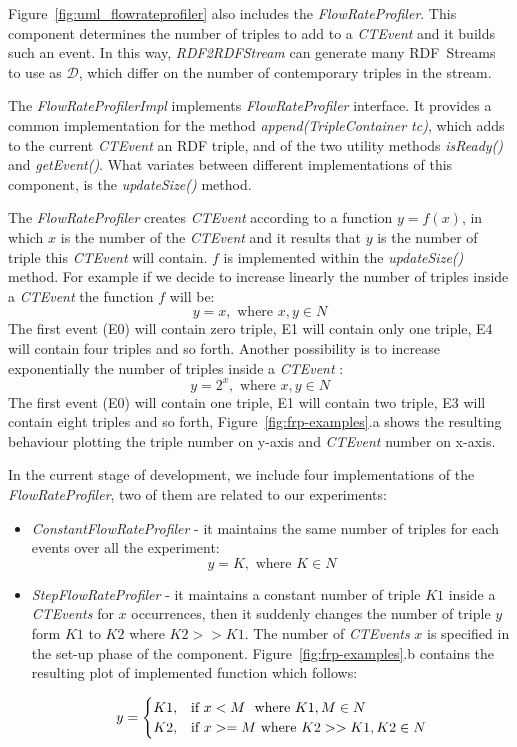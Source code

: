 Figure~\ref{fig:uml_flowrateprofiler} also includes the \textit{FlowRateProfiler}. This component determines the number of triples to add to a \textit{CTEvent} and it builds such an event. In this way, \textit{RDF2RDFStream} can generate many RDF~Streams to use as $\mathcal{D}$, which differ on the number of contemporary triples in the stream. 



The \textit{FlowRateProfilerImpl} implements \textit{FlowRateProfiler} interface. It provides a common implementation for the method \textit{append(TripleContainer tc)}, which adds to the current \textit{CTEvent} an RDF triple,  and of the two utility methods \textit{isReady()} and \textit{getEvent()}. What variates between different implementations of this component, is the \textit{updateSize()} method. 

The \textit{FlowRateProfiler} creates \textit{CTEvent} according to a function $y=f(x)$, in which $x$ is the number of the \textit{CTEvent} and it results that $y$ is the number of triple this \textit{CTEvent} will contain.  $f$ is implemented within the \textit{updateSize()} method. For example if we decide to increase linearly the number of triples inside a \textit{CTEvent} the function $f$ will be: \[y=x, \text{ where } x,y \in N\]
The first event (E0) will contain zero triple, E1 will contain only one triple, E4 will contain four triples and so forth. Another possibility is to increase exponentially the number of triples inside a \textit{CTEvent} : \[y=2^x, \text{ where } x,y \in N\]The first event (E0) will contain one triple, E1 will contain two triple, E3 will contain eight triples and so forth, Figure~\ref{fig:frp-examples}.a shows the resulting behaviour plotting the triple number on y-axis and \textit{CTEvent} number on x-axis.



In the current stage of development, we include four implementations of the \textit{FlowRateProfiler}, two of them are related to our experiments: 
\begin{itemize}
\item \textit{ConstantFlowRateProfiler} - it maintains the same number of triples for each events over all the experiment: \\
\[y=K, \text{ where } K \in N \]

\item \textit{StepFlowRateProfiler} - it maintains a constant number of triple $K1$ inside a \textit{CTEvents} for $x$ occurrences, then it suddenly changes the number of triple $y$ form $K1$ to $K2$ where $K2 >> K1$. The number of  \textit{CTEvents} $x$ is specified in the set-up phase of the component.  Figure~\ref{fig:frp-examples}.b contains the resulting plot of implemented function which follows:

\[
y=
\begin{cases}
K1, &\text{if $x < M$ } $ where $ K1, M \in N\\
K2, &\text{if $x >= M$} $ where $ K2 >> K1, K2 \in N
\end{cases}
\]


\end{itemize}

